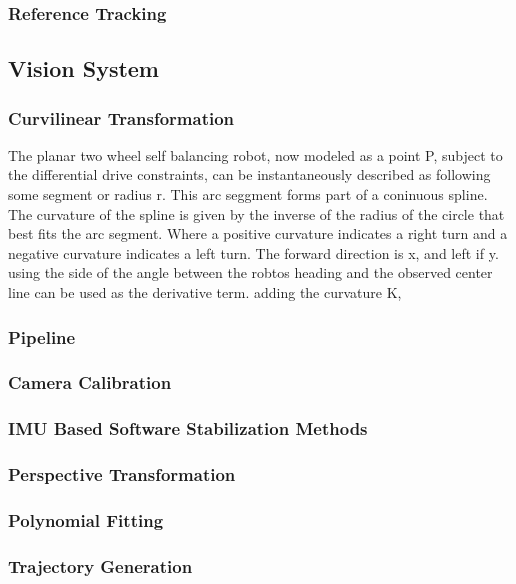         \subsubsection{Reference Tracking}

 

    \subsection{Vision System}
        \subsubsection{Curvilinear Transformation}
        The planar two wheel self balancing robot, now modeled as a point P, subject to the differential drive constraints, 
        can be instantaneously described as following some segment or radius r. This arc seggment forms part of a coninuous spline. 
        The curvature of the spline is given by the inverse of the radius of the circle that best fits the arc segment.
        Where a positive curvature indicates a right turn and a negative curvature indicates a left turn.
        The forward direction is x, and left if y. using the side of the angle between the robtos heading and the observed center line can be used as the derivative term.
        adding the curvature K, 
            \subsubsection{Pipeline}
            \subsubsection{Camera Calibration}
            \subsubsection{IMU Based Software Stabilization Methods}
            \subsubsection{Perspective Transformation}
            \subsubsection{Polynomial Fitting}
            \subsubsection{Trajectory Generation}


